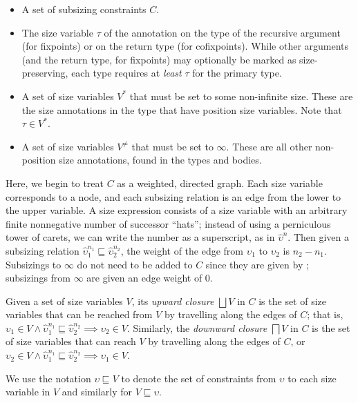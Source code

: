 \begin{itemize}
  \item A set of subsizing constraints $C$.
  \item The size variable $\tau$ of the annotation on the type of the recursive argument (for fixpoints) or on the return type (for cofixpoints). While other arguments (and the return type, for fixpoints) may optionally be marked as size-preserving, each \cofixpoint type requires at \textit{least} $\tau$ for the primary \corecursive type.
  \item A set of size variables $V^*$ that must be set to some non-infinite size.
    These are the size annotations in the \cofixpoint type that have position size variables.
    Note that $\tau \in V^*$.
  \item A set of size variables $V^\neq$ that must be set to $\infty$.
    These are all other non-position size annotations, found in the \cofixpoint types and bodies.
\end{itemize}

Here, we begin to treat $C$ as a weighted, directed graph.
Each size variable corresponds to a node, and each subsizing relation is an edge from the lower to the upper variable.
A size expression consists of a size variable with an arbitrary finite nonnegative number of successor ``hats''; instead of using a perniculous tower of carets, we can write the number as a superscript, as in $\hat{\upsilon}^n$.
Then given a subsizing relation $\hat{\upsilon}_1^{n_1} \sqsubseteq \hat{\upsilon}_2^{n_2}$, the weight of the edge from $\upsilon_1$ to $\upsilon_2$ is $n_2 - n_1$.
Subsizings to $\infty$ do not need to be added to $C$ since they are given by ; subsizings from $\infty$ are given an edge weight of $0$.

Given a set of size variables $V$, its \emph{upward closure} $\bigsqcup V$ in $C$ is the set of size variables that can be reached from $V$ by travelling along the edges of $C$; that is, $\upsilon_1 \in V \wedge \hat{\upsilon}_1^{n_1} \sqsubseteq \hat{\upsilon}_2^{n_2} \implies \upsilon_2 \in V$.
Similarly, the \emph{downward closure} $\bigsqcap V$ in $C$ is the set of size variables that can reach $V$ by travelling along the edges of $C$, or $\upsilon_2 \in V \wedge \hat{\upsilon}_1^{n_1} \sqsubseteq \hat{\upsilon}_2^{n_2} \implies \upsilon_1 \in V$.

We use the notation $\upsilon \sqsubseteq V$ to denote the set of constraints from $\upsilon$ to each size variable in $V$ and similarly for $V \sqsubseteq \upsilon$.

